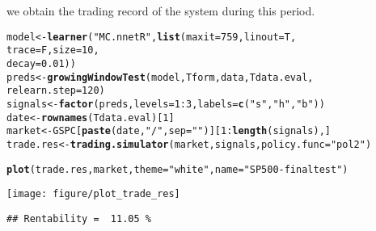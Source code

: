 \documentclass{article}\usepackage[]{graphicx}\usepackage[]{color}
\makeatletter
\def\maxwidth{ %
  \ifdim\Gin@nat@width>\linewidth
    \linewidth
  \else
    \Gin@nat@width
  \fi
}
\newcommand{\hlnum}[1]{\textcolor[rgb]{0.686,0.059,0.569}{#1}}%
\newcommand{\hlstr}[1]{\textcolor[rgb]{0.192,0.494,0.8}{#1}}%
\newcommand{\hlopt}[1]{\textcolor[rgb]{0,0,0}{#1}}%
\newcommand{\hlstd}[1]{\textcolor[rgb]{0.345,0.345,0.345}{#1}}%
\newcommand{\hlkwb}[1]{\textcolor[rgb]{0.69,0.353,0.396}{#1}}%
\newcommand{\hlkwc}[1]{\textcolor[rgb]{0.333,0.667,0.333}{#1}}%
\newcommand{\hlkwd}[1]{\textcolor[rgb]{0.737,0.353,0.396}{\textbf{#1}}}%
\newenvironment{kframe}{%
 \def\at@end@of@kframe{}%
 \ifinner\ifhmode%
  \def\at@end@of@kframe{\end{minipage}}%
  \begin{minipage}{\columnwidth}%
 \fi\fi%
 \def\FrameCommand##1{\hskip\@totalleftmargin \hskip-\fboxsep
 \colorbox{shadecolor}{##1}\hskip-\fboxsep
     \hskip-\linewidth \hskip-\@totalleftmargin \hskip\columnwidth}%
 \MakeFramed {\advance\hsize-\width
   \@totalleftmargin\z@ \linewidth\hsize
   \@setminipage}}%
 {\par\unskip\endMakeFramed%
 \at@end@of@kframe}
\newenvironment{knitrout}{}{} %
\makeatother
\begin{document}
we obtain the trading record of the system during this period.
\begin{knitrout}
\color{fgcolor}\begin{kframe}
\begin{alltt}
\hlstd{model} \hlkwb{<-} \hlkwd{learner}\hlstd{(}\hlstr{"MC.nnetR"}\hlstd{,} \hlkwd{list}\hlstd{(}\hlkwc{maxit} \hlstd{=} \hlnum{759}\hlstd{,} \hlkwc{linout} \hlstd{= T,}
                                  \hlkwc{trace} \hlstd{= F,} \hlkwc{size} \hlstd{=} \hlnum{10}\hlstd{,}
                                  \hlkwc{decay} \hlstd{=} \hlnum{0.01}\hlstd{))}
\hlstd{preds} \hlkwb{<-} \hlkwd{growingWindowTest}\hlstd{(model, Tform, data, Tdata.eval,}
                           \hlkwc{relearn.step} \hlstd{=} \hlnum{120}\hlstd{)}
\hlstd{signals} \hlkwb{<-} \hlkwd{factor}\hlstd{(preds,} \hlkwc{levels} \hlstd{=} \hlnum{1}\hlopt{:}\hlnum{3}\hlstd{,} \hlkwc{labels} \hlstd{=} \hlkwd{c}\hlstd{(}\hlstr{"s"}\hlstd{,} \hlstr{"h"}\hlstd{,} \hlstr{"b"}\hlstd{))}
\hlstd{date} \hlkwb{<-} \hlkwd{rownames}\hlstd{(Tdata.eval)[}\hlnum{1}\hlstd{]}
\hlstd{market} \hlkwb{<-} \hlstd{GSPC[}\hlkwd{paste}\hlstd{(date,} \hlstr{"/"}\hlstd{,} \hlkwc{sep} \hlstd{=} \hlstr{""}\hlstd{)][}\hlnum{1}\hlopt{:}\hlkwd{length}\hlstd{(signals), ]}
\hlstd{trade.res} \hlkwb{<-} \hlkwd{trading.simulator}\hlstd{(market, signals,} \hlkwc{policy.func} \hlstd{=} \hlstr{"pol2"}\hlstd{)}
\end{alltt}
\end{kframe}
\end{knitrout}
\begin{knitrout}
\color{fgcolor}\begin{kframe}
\begin{alltt}
\hlkwd{plot}\hlstd{(trade.res, market,} \hlkwc{theme} \hlstd{=} \hlstr{"white"}\hlstd{,} \hlkwc{name} \hlstd{=} \hlstr{"SP500-final test"}\hlstd{)}
\end{alltt}
\end{kframe}
\texttt{[image: figure/plot\_trade\_res]} 
\begin{kframe}\begin{verbatim}
## Rentability =  11.05 %
\end{verbatim}
\end{kframe}
\end{knitrout}
\end{document}
